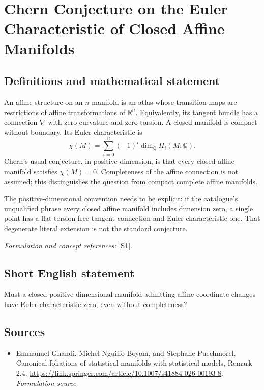 \documentclass[11pt]{article}
\begin{document}
\section*{\texorpdfstring{Chern Conjecture on the Euler Characteristic of Closed Affine Manifolds}{Chern Conjecture on the Euler Characteristic of Closed Affine Manifolds}}\label{498}
\subsection{Definitions and mathematical statement}
An affine structure on an $n$-manifold is an atlas whose transition maps are restrictions of affine transformations of ${\mathbb{R}}^n$. Equivalently, its tangent bundle has a connection $\nabla$ with zero curvature and zero torsion. A closed manifold is compact without boundary. Its Euler characteristic is
\[
 \chi(M)=\sum_{i=0}^n(-1)^i\dim_{{\mathbb{Q}}} H_i(M;{\mathbb{Q}}).
\]
Chern's usual conjecture, in positive dimension, is that every closed affine manifold satisfies $\chi(M)=0$. Completeness of the affine connection is not assumed; this distinguishes the question from compact complete affine manifolds.

The positive-dimensional convention needs to be explicit: if the catalogue's unqualified phrase every closed affine manifold includes dimension zero, a single point has a flat torsion-free tangent connection and Euler characteristic one. That degenerate literal extension is not the standard conjecture.
\par\smallskip\textit{Formulation and concept references:} \href{https://link.springer.com/article/10.1007/s41884-026-00193-8}{[S1]}.

\subsection{Short English statement}
Must a closed positive-dimensional manifold admitting affine coordinate changes have Euler characteristic zero, even without completeness?
\subsection{Sources}
\begin{itemize}
\item[S1]Emmanuel Gnandi, Michel Nguiffo Boyom, and Stephane Puechmorel, Canonical foliations of statistical manifolds with statistical models, Remark 2.4.
\url{https://link.springer.com/article/10.1007/s41884-026-00193-8}.
\textit{Formulation source.}
\end{itemize}
\end{document}
